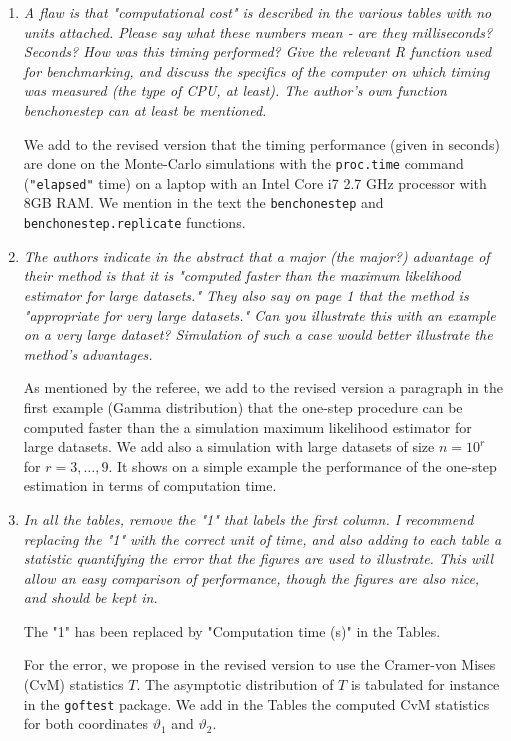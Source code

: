 \documentclass[11pt, a4paper]{article}
\begin{document}
\begin{enumerate}

\item {\it A flaw is that "computational cost" is described in the various tables
with no units attached.  Please say what these numbers mean - are they
milliseconds?  Seconds?  How was this timing performed?  Give the
relevant R function used for benchmarking, and discuss the specifics
of the computer on which timing was measured (the type of CPU, at
least).  The author's own function benchonestep can at least be
mentioned. }

We add to the revised version that the timing performance (given in seconds) are done on the Monte-Carlo simulations with the \texttt{proc.time} command (\texttt{"elapsed"} time) on a laptop with an Intel Core i7 2.7 GHz processor with 8GB RAM. We mention in the text the \texttt{benchonestep} and \texttt{benchonestep.replicate} functions.

\item {\it The authors indicate in the abstract that a major (the major?)
advantage of their method is that it is "computed faster than the
maximum likelihood estimator for large datasets." They also say on
page 1 that the method is "appropriate for very large datasets."  Can
you illustrate this with an example on a very large dataset?
Simulation of such a case would better illustrate the method's
advantages.}

As mentioned by the referee, we add to the revised version a paragraph in the first example (Gamma distribution)  that the one-step procedure can be computed faster than the a simulation maximum likelihood estimator for large datasets. We add also a simulation with large datasets of size $n=10^r$ for $r=3,\ldots,9$.  It shows on a simple example the performance of the one-step estimation in terms of computation time. 

\item {\it In all the tables, remove the "1" that labels the first column.  I
recommend replacing the "1" with the correct unit of time, and also
adding to each table a statistic quantifying the error that the
figures are used to illustrate.  This will allow an easy comparison of
performance, though the figures are also nice, and should be kept in.}

The "1" has been replaced by "Computation time (s)" in the Tables. 


For the error, we propose in the revised version to use the Cramer-von Mises (CvM) statistics $T$. The asymptotic distribution of $T$ is tabulated for instance in the \texttt{goftest} package. We add in the Tables the computed CvM statistics for both coordinates $\vartheta_1$ and $\vartheta_2$. 


\end{enumerate}
\end{document}
